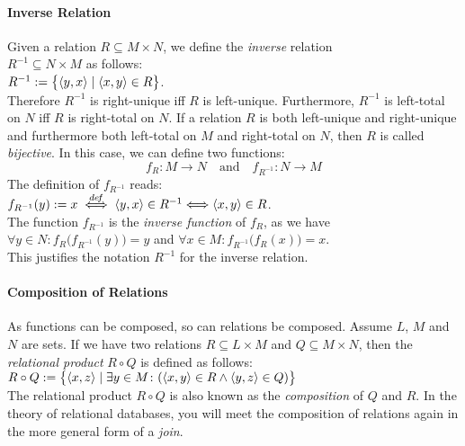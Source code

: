 \paragraph{Inverse Relation}
Given a relation $R \subseteq M \times N$, we define the \emph{inverse} relation \\
$R^{-1} \subseteq N \times M$ as follows: \\[0.2cm]
\hspace*{1.3cm} $R^{-1} := \bigl\{ \pair(y,x) \mid \pair(x,y) \in R  \bigr\}$. \\[0.2cm]
Therefore $R^{-1}$ is right-unique iff $R$ is left-unique.  Furthermore, $R^{-1}$ is
left-total on $N$ iff $R$ 
is right-total on $N$.  
If a relation $R$ is both  left-unique and right-unique and furthermore
both left-total on $M$ and right-total on $N$, then $R$ is called  \emph{bijective}.
In this case, we can define two functions: 
\[ f_R: M \rightarrow N \quad \mbox{and} \quad f_{R^{-1}}:N \rightarrow M \]
The definition of $f_{R^{-1}}$ reads:
 \\[0.2cm]
\hspace*{1.3cm}
 $f_{R^{-1}}(y) := x \;\stackrel{de\!f}{\Longleftrightarrow}\; \pair(y,x) \in R^{-1}
 \Longleftrightarrow \pair(x,y) \in R$. 
\\[0.2cm]
The function $f_{R^{-1}}$ is the \emph{inverse function} of  $f_R$, as we have \\[0.2cm]
\hspace*{1.3cm}
 $\forall y \in N \colon f_R\bigl(f_{R^{-1}}(y)\bigr) = y$ \quad and \quad
 $\forall x \in M \colon f_{R^{-1}}\bigl(f_R(x)\bigr) = x$. \\[0.2cm]
This justifies the notation $R^{-1}$ for the inverse relation.

\paragraph{Composition of Relations}
As functions can be composed, so can relations be composed.
Assume $L$, $M$ and $N$ are sets.
If we have two relations  $R \subseteq L \times M$ and $Q \subseteq M \times N$, then the
 \emph{relational product} $R \circ Q$ is defined as follows: \\[0.2cm]
\hspace*{1.3cm}
$R \circ Q := \bigl\{ \pair(x,z) \mid \exists y \in M \colon(\pair(x,y) \in R \wedge \pair(y,z) \in Q) \bigr\}$ 
\\[0.2cm]
The relational product $R \circ Q$ is also known as the \emph{composition} of
$Q$ and $R$.  In the theory of relational databases, you will meet the
composition of relations again in the  more general form of a \emph{join}.
\vspace{0.2cm}

